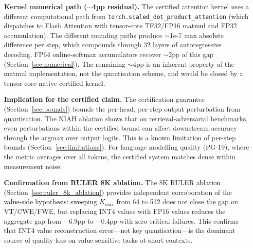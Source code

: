 \documentclass[11pt,a4paper]{article}
\theoremstyle{definition}
\theoremstyle{remark}
\newcommand{\torchsdpa}{\texttt{torch.scaled\_dot\_\hspace{0pt}product\_attention}}
\begin{document}
\textbf{Kernel numerical path ($\sim$4pp residual).}  The certified attention kernel uses a different computational path from \torchsdpa{} (which dispatches to Flash Attention with tensor-core TF32/FP16 matmul and FP32 accumulation).  The different rounding paths produce $\sim$1e-7 max absolute difference per step, which compounds through 32 layers of autoregressive decoding.  FP64 online-softmax accumulators recover $\sim$2pp of this gap (Section~\ref{sec:numerical}).  The remaining $\sim$4pp is an inherent property of the matmul implementation, not the quantisation scheme, and would be closed by a tensor-core-native certified kernel.

\textbf{Implication for the certified claim.}  The certification guarantee (Section~\ref{sec:bounds}) bounds the per-head, per-step output perturbation from quantisation.  The NIAH ablation shows that on retrieval-adversarial benchmarks, even perturbations within the certified bound can affect downstream accuracy through the argmax over output logits.  This is a known limitation of per-step bounds (Section~\ref{sec:limitations}).  For language modelling quality (PG-19), where the metric averages over all tokens, the certified system matches dense within measurement noise.

\textbf{Confirmation from RULER 8K ablation.}  The 8K RULER ablation (Section~\ref{sec:ruler_8k_ablation}) provides independent corroboration of the value-side hypothesis: sweeping $K_{\max}$ from 64 to 512 does not close the gap on VT/CWE/FWE, but replacing INT4 values with FP16 values reduces the aggregate gap from $-6.9$pp to $-0.4$pp with zero critical failures.  This confirms that INT4 value reconstruction error---not key quantisation---is the dominant source of quality loss on value-sensitive tasks at short contexts.
\end{document}
